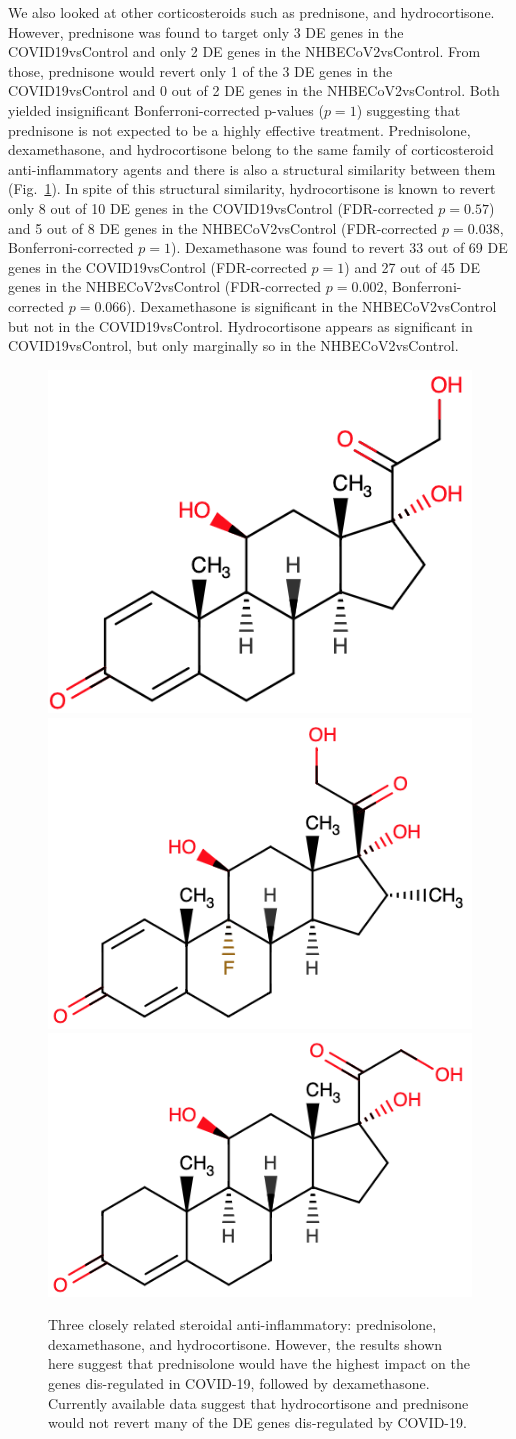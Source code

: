 We also looked at other corticosteroids such as prednisone, and hydrocortisone. However, prednisone was found to target only 3 DE genes in the COVID19vsControl and only 2 DE genes in the NHBECoV2vsControl. From those, prednisone would revert only 1 of the 3 DE genes in the COVID19vsControl and 0 out of 2 DE genes in the NHBECoV2vsControl. Both yielded insignificant Bonferroni-corrected p-values ($p=1$) suggesting that prednisone is not expected to be a highly effective treatment. Prednisolone, dexamethasone, and hydrocortisone belong to the same family of corticosteroid anti-inflammatory agents and there is also a structural similarity between them (Fig.~\ref{Supp:steroids}). In spite of this structural similarity, hydrocortisone is known to revert only 8 out of 10 DE genes in the COVID19vsControl (FDR-corrected $p=0.57$) and 5 out of 8 DE genes in the NHBECoV2vsControl (FDR-corrected $p=0.038$, Bonferroni-corrected  $p=1$). Dexamethasone was found to revert 33 out of 69 DE genes in the COVID19vsControl (FDR-corrected $p=1$) and 27 out of 45 DE genes in the NHBECoV2vsControl (FDR-corrected $p=0.002$, Bonferroni-corrected $p=0.066$). Dexamethasone is significant in the NHBECoV2vsControl but not in the COVID19vsControl. Hydrocortisone appears as significant in COVID19vsControl, but only marginally so in the NHBECoV2vsControl.

\begin{figure}
\centering
	\includegraphics[width=0.2\linewidth]{../Figures/prednisolone.png}
	\includegraphics[width=0.2\linewidth]{../Figures/dexamethasone.png}
	\includegraphics[width=0.2\linewidth]{../Figures/hydrocortisone.png}
        \caption{Three closely related steroidal anti-inflammatory: prednisolone, dexamethasone, and hydrocortisone. However, the results shown here suggest that prednisolone would have the highest impact on the genes dis-regulated in COVID-19, followed by dexamethasone. Currently available data suggest that hydrocortisone and prednisone would not revert many of the DE genes dis-regulated by COVID-19.}
        \label{Supp:steroids}
\end{figure}

